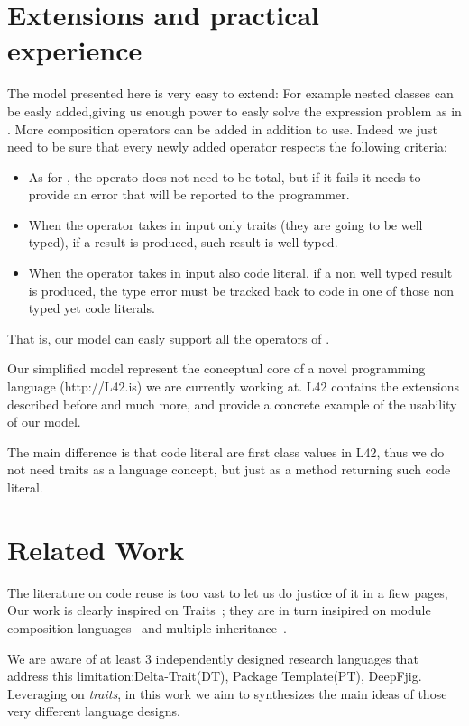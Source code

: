 \section{Extensions and practical experience}
The model presented here is very easy to extend:
For example nested classes can be easly added,giving us enough power to easly solve the expression problem as in \cite{deepfjig}. More composition operators can be added in addition to use. Indeed
we just need to be sure that every newly added operator respects the following criteria:

\begin{itemize}
\item As for \use, the operato does not need to be total, but if it fails it needs to provide an error that will be reported to the programmer.
\item When the operator takes in input only traits (they are going to be well typed), if a result is produced,
 such result is well typed.
\item When the operator takes in input also code literal, if a non well typed result is produced,
the type error must be tracked back to code in one of those non typed yet code literals.
 \end{itemize}
 That is, our model can easly support all the operators of \cite{deep}.
 
 
 Our simplified model represent the conceptual core of  a novel programming language (http://L42.is)
 we are currently working at.
 L42 contains the extensions described before and much more, and provide a concrete example of the usability of our model.
 
 The main difference is that code literal are first class values in L42, thus we do not need traits as a language concept, but just as a method returning such code literal.
 
 
 
\section{Related Work}
The literature on code reuse is too vast to let us do justice of it in a fiew pages,
Our work is clearly inspired on Traits~\cite{ducasse2006traits}; they are in turn insipired on module composition languages~\cite{ancona2002calculus}
and multiple inheritance~\cite{}.

We are aware of at least 3 independently designed research languages 
that address this limitation:Delta-Trait(DT)\cite{3ferruccio works}, Package Template(PT)\cite{}, DeepFjig\cite{}.
Leveraging on \emph{traits}, in this work we aim to synthesizes
the main ideas of those very different language designs.

